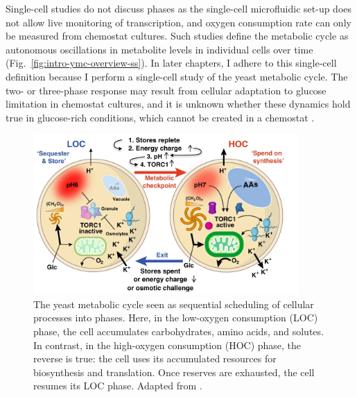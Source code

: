 Single-cell studies \parencite{papagiannakisAutonomousMetabolicOscillations2017, baumgartnerFlavinbasedMetabolicCycles2018} do not discuss phases as the single-cell microfluidic set-up does not allow live monitoring of transcription, and oxygen consumption rate can only be measured from chemostat cultures.
Such studies define the metabolic cycle as autonomous oscillations in metabolite levels in individual cells over time (Fig.\ \ref{fig:intro-ymc-overview-ss}).
In later chapters, I adhere to this single-cell definition because I perform a single-cell study of the yeast metabolic cycle.
The two- or three-phase response may result from cellular adaptation to glucose limitation in chemostat cultures, and it is unknown whether these dynamics hold true in glucose-rich conditions, which cannot be created in a chemostat \parencite{slavovCouplingGrowthRate2011}.

\begin{figure}
  \centering
  \includegraphics[width=0.9\textwidth]{oneillEukaryoticCellBiology2020_3a_adapted}
  \caption[
    The yeast metabolic cycle seen as sequential scheduling of cellular processes into phases
  ]{
    The yeast metabolic cycle seen as sequential scheduling of cellular processes into phases.
    Here, in the low-oxygen consumption (LOC) phase, the cell accumulates carbohydrates, amino acids, and solutes.
    In contrast, in the high-oxygen consumption (HOC) phase, the reverse is true:
    the cell uses its accumulated resources for biosynthesis and translation.
    Once reserves are exhausted, the cell resumes its LOC phase.
    Adapted from \textcite{oneillEukaryoticCellBiology2020}.}
  \label{fig:intro-ymc-overview-oneill}
\end{figure}

